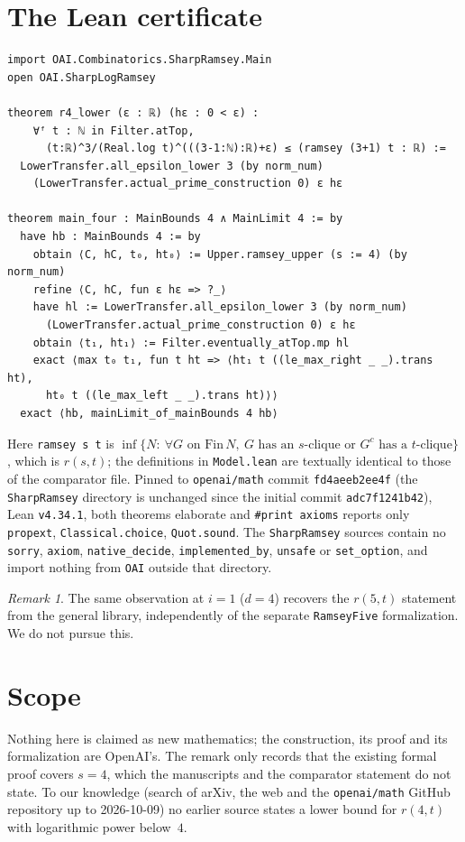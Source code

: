 \documentclass[11pt]{amsart}
\theoremstyle{remark}
\newtheorem{remark}[theorem]{Remark}
\begin{document}
\section{The Lean certificate}
\begin{Verbatim}
import OAI.Combinatorics.SharpRamsey.Main
open OAI.SharpLogRamsey

theorem r4_lower (ε : ℝ) (hε : 0 < ε) :
    ∀ᶠ t : ℕ in Filter.atTop,
      (t:ℝ)^3/(Real.log t)^(((3-1:ℕ):ℝ)+ε) ≤ (ramsey (3+1) t : ℝ) :=
  LowerTransfer.all_epsilon_lower 3 (by norm_num)
    (LowerTransfer.actual_prime_construction 0) ε hε

theorem main_four : MainBounds 4 ∧ MainLimit 4 := by
  have hb : MainBounds 4 := by
    obtain ⟨C, hC, t₀, ht₀⟩ := Upper.ramsey_upper (s := 4) (by norm_num)
    refine ⟨C, hC, fun ε hε => ?_⟩
    have hl := LowerTransfer.all_epsilon_lower 3 (by norm_num)
      (LowerTransfer.actual_prime_construction 0) ε hε
    obtain ⟨t₁, ht₁⟩ := Filter.eventually_atTop.mp hl
    exact ⟨max t₀ t₁, fun t ht => ⟨ht₁ t ((le_max_right _ _).trans ht),
      ht₀ t ((le_max_left _ _).trans ht)⟩⟩
  exact ⟨hb, mainLimit_of_mainBounds 4 hb⟩
\end{Verbatim}
Here \texttt{ramsey s t} is
$\inf\{N:\ \forall G\text{ on }\mathrm{Fin}\,N,\ G\text{ has an }s\text{-clique or }G^{c}\text{ has a }t\text{-clique}\}$,
which is $r(s,t)$; the definitions in \texttt{Model.lean} are textually
identical to those of the comparator file. Pinned to
\texttt{openai/math} commit \texttt{fd4aeeb2ee4f} (the
\texttt{SharpRamsey} directory is unchanged since the initial commit
\texttt{adc7f1241b42}), Lean \texttt{v4.34.1}, both theorems elaborate and
\texttt{\#print axioms} reports only \texttt{propext},
\texttt{Classical.choice}, \texttt{Quot.sound}. The \texttt{SharpRamsey}
sources contain no \texttt{sorry}, \texttt{axiom}, \texttt{native\_decide},
\texttt{implemented\_by}, \texttt{unsafe} or \texttt{set\_option}, and import
nothing from \texttt{OAI} outside that directory.

\begin{remark}
The same observation at $i=1$ ($d=4$) recovers the $r(5,t)$ statement
from the general library, independently of the separate
\texttt{RamseyFive} formalization. We do not pursue this.
\end{remark}

\section*{Scope}
Nothing here is claimed as new mathematics; the construction, its proof
and its formalization are OpenAI's. The remark only records that the
existing formal proof covers $s=4$, which the manuscripts and the
comparator statement do not state. To our knowledge (search of arXiv,
the web and the \texttt{openai/math} GitHub repository up to 2026-10-09)
no earlier source states a lower bound for $r(4,t)$ with logarithmic power
below~$4$.
\end{document}
